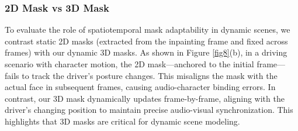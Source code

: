\subsubsection{2D Mask vs 3D Mask}  
To evaluate the role of spatiotemporal mask adaptability in dynamic scenes, we contrast static 2D masks (extracted from the inpainting frame and fixed across frames) with our dynamic 3D masks. As shown in Figure \ref{fig8}(b), in a driving scenario with character motion, the 2D mask—anchored to the initial frame—fails to track the driver’s posture changes. This misaligns the mask with the actual face in subsequent frames, causing audio-character binding errors.
In contrast, our 3D mask dynamically updates frame-by-frame, aligning with the driver’s changing position to maintain precise audio-visual synchronization. This highlights that 3D masks are critical for dynamic scene modeling.